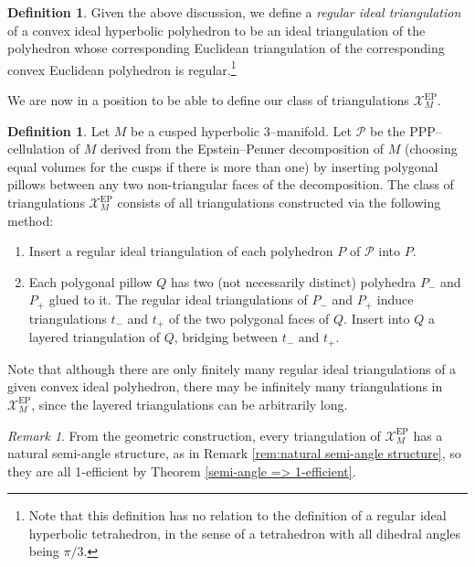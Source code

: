 \documentclass[12pt]{amsart}
\theoremstyle{definition}
\newtheorem{defn}[thm]{Definition}
\theoremstyle{remark}
\newtheorem{rmk}[thm]{Remark}
\def\calX{\mathcal X}
\def\EP{\mathrm{EP}}
\begin{document}
\begin{defn}
Given the above discussion, we define a \emph{regular ideal triangulation} of a convex ideal hyperbolic polyhedron to be an ideal triangulation of the polyhedron whose corresponding Euclidean triangulation of the corresponding convex Euclidean polyhedron is regular.\footnote{Note that this definition has no relation to the definition of a regular ideal hyperbolic tetrahedron, in the sense of a tetrahedron with all dihedral angles being $\pi/3$. } 
\end{defn}
We are now  in a position to be able to define our class of triangulations $\calX_M^{\EP}$. 

\begin{defn}
Let $M$ be a cusped hyperbolic 3--manifold. Let $\mathcal{P}$ be the PPP--cellulation of $M$ derived from the Epstein--Penner decomposition of $M$ (choosing equal volumes for the cusps if there is more than one) by inserting polygonal pillows between any two non-triangular faces of the decomposition. The class of triangulations $\calX_M^{\EP}$ consists of all triangulations constructed via the following method:
\begin{enumerate}
\item Insert a regular ideal triangulation of each polyhedron $P$ of $\mathcal{P}$ into $P$.
\item Each polygonal pillow $Q$ has two (not necessarily distinct) polyhedra $P_-$ and $P_+$ glued to it. The regular ideal triangulations of $P_-$ and $P_+$ induce triangulations $t_-$ and $t_+$ of the two polygonal faces of $Q$. Insert into $Q$ a layered triangulation of $Q$, bridging between $t_-$ and $t_+$.
\end{enumerate}
\end{defn}
Note that although there are only finitely many regular ideal triangulations of a given convex ideal polyhedron, there may be infinitely many triangulations in $\calX_M^{\EP}$, since the layered triangulations can be arbitrarily long.

\begin{rmk}\label{Xbar^EP 1-efficient}
From the geometric construction, every triangulation of $\calX_M^{\EP}$ has a natural semi-angle structure, as in Remark \ref{rem:natural semi-angle structure}, so they are all 1-efficient by Theorem \ref{semi-angle => 1-efficient}.
\end{rmk}
\end{document}
